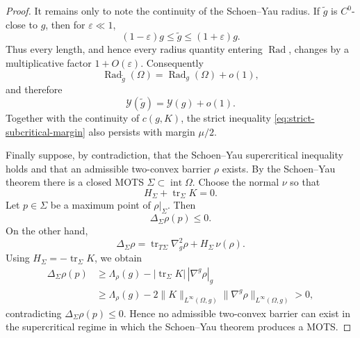 \documentclass{amsart}
\begin{document}
{\begin{proof}
\noindent It remains only to note the continuity of the Schoen--Yau radius. If
\(\widetilde g\) is \(C^0\)-close to \(g\), then for \(\varepsilon\ll1\),
\[
        (1-\varepsilon)g\le \widetilde g\le (1+\varepsilon)g .
\]
Thus every length, and hence every radius quantity entering
\(\operatorname{Rad}\), changes by a multiplicative factor
\(1+O(\varepsilon)\). Consequently
\[
        \operatorname{Rad}_{\widetilde g}(\Omega)
        =
        \operatorname{Rad}_{g}(\Omega)+o(1),
\]
and therefore
\[
        \mathcal Y(\widetilde g)=\mathcal Y(g)+o(1).
\]
Together with the continuity of \(c(g,K)\), the strict inequality
\eqref{eq:strict-subcritical-margin} also persists with margin
\(\mu/2\).

\noindent Finally suppose, by contradiction, that the Schoen--Yau supercritical
inequality holds and that an admissible two-convex barrier \(\rho\)
exists. By the Schoen--Yau theorem there is a closed MOTS
\(\Sigma\subset\operatorname{int}\Omega\). Choose the normal \(\nu\) so
that
\[
        H_\Sigma+\operatorname{tr}_{\Sigma}K=0 .
\]
Let \(p\in\Sigma\) be a maximum point of \(\rho|_\Sigma\). Then
\[
        \Delta_\Sigma\rho(p)\le0.
\]
On the other hand,
\[
        \Delta_\Sigma\rho
        =
        \operatorname{tr}_{T\Sigma}\nabla_g^2\rho
        +
        H_\Sigma\,\nu(\rho).
\]
Using \(H_\Sigma=-\operatorname{tr}_{\Sigma}K\), we obtain
\[
\begin{aligned}
        \Delta_\Sigma\rho(p)
        &\ge
        \Lambda_\rho(g)
        -
        |\operatorname{tr}_{\Sigma}K|\,
        |\nabla^g\rho|_g                                      \\
        &\ge
        \Lambda_\rho(g)
        -
        2\|K\|_{L^\infty(\Omega,g)}
        \|\nabla^g\rho\|_{L^\infty(\Omega,g)}
        >
        0,
\end{aligned}
\]
contradicting \(\Delta_\Sigma\rho(p)\le0\). Hence no admissible
two-convex barrier can exist in the supercritical regime in which the
Schoen--Yau theorem produces a MOTS.
\end{proof}




\noindent %

}
\end{document}
